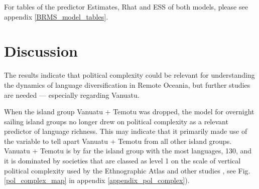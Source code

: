 \documentclass[unnumsec,webpdf,modern,medium]{oup-authoring-template}
\begin{document}
For tables of the predictor Estimates, Rhat and ESS of both models, please see appendix \ref{BRMS_model_tables}.








\FloatBarrier
\section{Discussion}
\label{pol_study_discisson}
The results indicate that political complexity could be relevant for understanding the dynamics of language diversification in Remote Oceania, but further studies are needed --- especially regarding Vanuatu. 

When the island group Vanuatu + Temotu was dropped, the model for overnight sailing island groups no longer drew on political complexity as a relevant predictor of language richness. This may indicate that it primarily made use of the variable to tell apart Vanuatu + Temotu from all other island groups. Vanuatu + Temotu is by far the island group with the most languages, 130, and it is dominated by societies that are classed as level 1 on the scale of vertical political complexity used by the Ethnographic Atlas \citep{gray1998ethnographic} and other studies \citep{watts_2018}, see Fig. \ref{pol_complex_map} in appendix \ref{appendix_pol_complex}).
\end{document}
